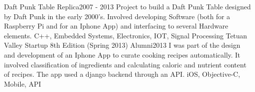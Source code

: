 %
%
%
%


\begin{projects}
	\project
	{Daft Punk Table Replica}{2007 - 2013}
	{}
	{Project to build a Daft Punk Table designed by Daft Punk in the early 2000's. Involved developing Software (both for a Raspberry Pi and for an Iphone App) and interfacing to several Hardware elements.}
	{C++, Embedded Systems, Electronics, IOT, Signal Processing}
	\project
	{Tetuan Valley Startup 8th Edition (Spring 2013) Alumni}{2013}
	{}
	{I was part of the design and development of an Iphone App to curate cooking recipes automatically. It involved classification of ingredients and calculating caloric and nutrient content of recipes. The app used a django backend through an API.}
	{iOS, Objective-C, Mobile, API}
\end{projects}